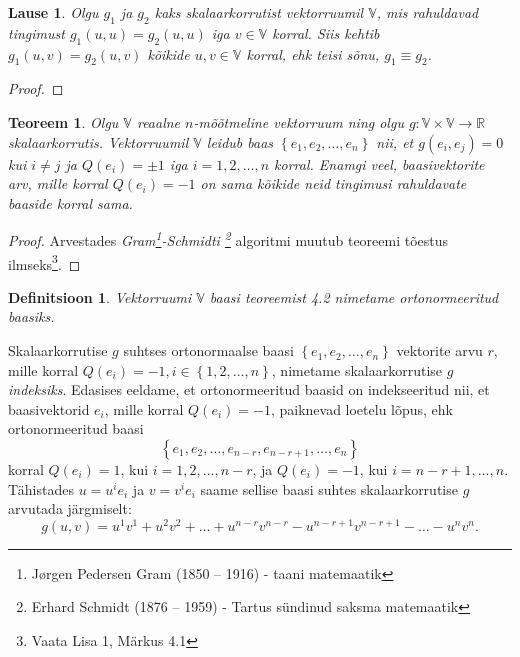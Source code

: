 \documentclass[a4paper,12pt]{article}
\newtheorem{teoreem}{Teoreem}[section]
\newtheorem{definitsioon}{Definitsioon}[section]
\newtheorem{lause}{Lause}[section]
\numberwithin{equation}{section}
\begin{document}
\begin{lause}
Olgu $g_1$ ja $g_2$ kaks skalaarkorrutist vektorruumil $\mathbb{V}$, mis rahuldavad tingimust $g_1 \left(u, u \right) = g_2 \left(u, u \right)$ iga $v \in \mathbb{V}$ korral. Siis kehtib $g_1 \left(u, v \right) = g_2 \left(u, v \right)$ kõikide $u, v \in \mathbb{V}$ korral, ehk teisi sõnu, $g_1 \equiv g_2$.
\end{lause}

\begin{proof}
\lipsum[7]
\end{proof}

\begin{teoreem}
Olgu $\mathbb{V}$ reaalne $n$-mõõtmeline vektorruum ning olgu $g : \mathbb{V} \times \mathbb{V} \rightarrow \mathbb{R}$ skalaarkorrutis. Vektorruumil $\mathbb{V}$ leidub baas $\left\lbrace e_1, e_2, \dots, e_n \right\rbrace$ nii, et $g \left(e_i, e_j\right) = 0$ kui $i \neq j$ ja $Q\left(e_i\right) = \pm 1$ iga $i = 1, 2, \dots, n$ korral. Enamgi veel, baasivektorite arv, mille korral $Q \left(e_i\right) = -1$ on sama kõikide neid tingimusi rahuldavate baaside korral sama.
\end{teoreem}

\begin{proof}
Arvestades \textit{Gram\footnote{Jørgen Pedersen Gram (1850 – 1916) - taani matemaatik}-Schmidti \footnote{Erhard Schmidt (1876 – 1959) - Tartus sündinud saksma matemaatik}} algoritmi muutub teoreemi tõestus ilmseks\footnote{Vaata Lisa 1, Märkus 4.1}.
\end{proof}

\begin{definitsioon}
Vektorruumi $\mathbb{V}$ baasi teoreemist 4.2 nimetame ortonormeeritud baasiks.
\end{definitsioon}

Skalaarkorrutise $g$ suhtses ortonormaalse baasi $\left\lbrace e_1, e_2, \dots, e_n \right\rbrace$ vektorite arvu $r$, mille korral $Q \left(e_i\right) = -1, i \in \left\lbrace 1, 2, \dots, n \right\rbrace$, nimetame skalaarkorrutise $g$ \emph{indeksiks}.
Edasises eeldame, et ortonormeeritud baasid on indekseeritud nii, et baasivektorid $e_i$, mille korral $Q \left(e_i\right) = -1$, paiknevad loetelu lõpus, ehk ortonormeeritud baasi 
\[\left\lbrace e_1, e_2, \dots, e_{n-r}, e_{n-r+1}, \dots, e_n \right\rbrace\]
korral $Q \left(e_i\right) = 1$, kui $i = 1, 2, \dots, n-r$, ja $Q \left(e_i\right) = -1$, kui $i = n-r+1, \dots, n$. Tähistades $u = u^i e_i$ ja $v = v^i e_i$ saame sellise baasi suhtes skalaarkorrutise $g$ arvutada järgmiselt:
\[g\left(u, v\right) = u^1 v^1 + u^2 v^2 + \dots + u^{n-r} v^{n-r} - u^{n-r+1} v^{n-r+1} - \dots - u^n v^n.\]
\end{document}
